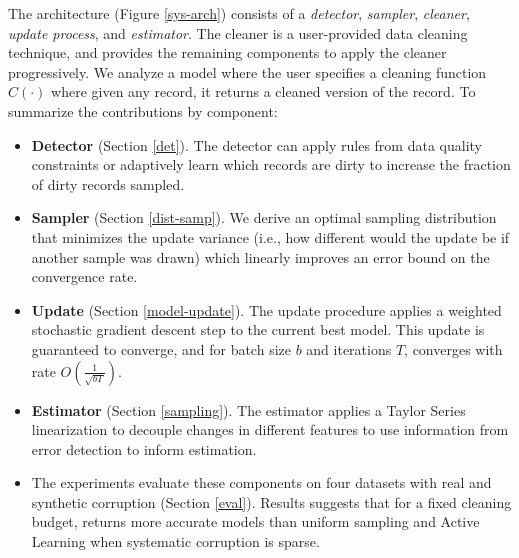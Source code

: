 The \sys architecture (Figure \ref{sys-arch}) consists of a \emph{detector}, \emph{sampler}, \emph{cleaner}, \emph{update process}, and \emph{estimator}.
The cleaner is a user-provided data cleaning technique, and \sys provides the remaining components to apply the cleaner progressively.
We analyze a model where the user specifies a cleaning function $C(\cdot)$ where given any record, it returns a cleaned version of the record.
To summarize the contributions by component:
\begin{itemize}[noitemsep]
\item \textbf{Detector} (Section \ref{det}). The detector can apply rules from data quality constraints or adaptively learn which records are dirty to increase the fraction of dirty records sampled.
\item \textbf{Sampler} (Section \ref{dist-samp}). We derive an optimal sampling distribution that minimizes the update variance (i.e., how different would the update be if another sample was drawn) which linearly improves an error bound on the convergence rate.
\item \textbf{Update} (Section \ref{model-update}). The update procedure applies a weighted stochastic gradient descent step to the current best model. This update is guaranteed to converge, and for batch size $b$ and iterations $T$, converges with rate $O(\frac{1}{\sqrt{bT}})$. 
\item \textbf{Estimator} (Section \ref{sampling}). The estimator applies a Taylor Series linearization to decouple changes in different features to use information from error detection to inform estimation.
\item The experiments evaluate these components on four datasets with real and synthetic corruption (Section \ref{eval}). Results suggests that for a fixed cleaning budget, \sys returns more accurate models than uniform sampling and Active Learning when systematic corruption is sparse.

\end{itemize}






